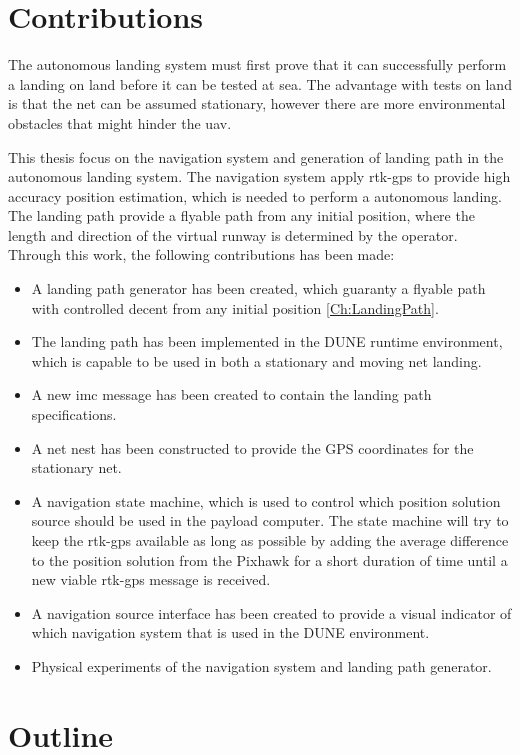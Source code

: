 \section{Contributions}
The autonomous landing system must first prove that it can successfully perform a landing on land before it can be tested at sea. The advantage with tests on land is that the net can be assumed stationary, however there are more environmental obstacles that might hinder the \gls{uav}.

This thesis focus on the navigation system and generation of landing path in the autonomous landing system. The navigation system apply \gls{rtk-gps} to provide high accuracy position estimation, which is needed to perform a autonomous landing. The landing path provide a flyable path from any initial position, where the length and direction of the virtual runway is determined by the operator. Through this work, the following contributions has been made:
\begin{itemize}
\item A landing path generator has been created, which guaranty a flyable path with controlled decent from any initial position \ref{Ch:LandingPath}.
\item The landing path has been implemented in the DUNE runtime environment, which is capable to be used in both a stationary and moving net landing.
\item A new \gls{imc} message has been created to contain the landing path specifications.
\item A net nest has been constructed to provide the GPS coordinates for the stationary net.
\item A navigation state machine, which is used to control which position solution source should be used in the payload computer. The state machine will try to keep the \gls{rtk-gps} available as long as possible by adding the average difference to the position solution from the Pixhawk for a short duration of time until a new viable \gls{rtk-gps} message is received.
\item  A navigation source interface has been created to provide a visual indicator of which navigation system that is used in the DUNE environment.
\item Physical experiments of the navigation system and landing path generator.
\end{itemize}
\section{Outline}
\cleardoublepage